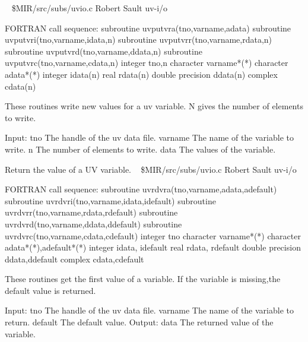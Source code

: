 \newline \ 
\newline {} \$MIR/src/subs/uvio.c
\newline {} Robert Sault
\newline {} uv-i/o
\par{\tenpoint
{\eightpoint\begintt
FORTRAN call sequence:
        subroutine uvputvra(tno,varname,adata)
        subroutine uvputvri(tno,varname,idata,n)
        subroutine uvputvrr(tno,varname,rdata,n)
        subroutine uvputvrd(tno,varname,ddata,n)
        subroutine uvputvrc(tno,varname,cdata,n)
        integer tno,n
        character varname*(*)
        character adata*(*)
        integer   idata(n)
        real      rdata(n)
        double precision ddata(n)
        complex cdata(n)

  These routines write new values for a uv variable. N gives the number
  of elements to write.

  Input:
    tno         The handle of the uv data file.
    varname     The name of the variable to write.
    n           The number of elements to write.
    data        The values of the variable.                             
\endtt}
\par}
%
\noindent Return the value of a UV variable.
\newline \ 
\newline {} \$MIR/src/subs/uvio.c
\newline {} Robert Sault
\newline \abox{Keywords:} uv-i/o
\par{\tenpoint
{\eightpoint\begintt
FORTRAN call sequence:
        subroutine uvrdvra(tno,varname,adata,adefault)
        subroutine uvrdvri(tno,varname,idata,idefault)
        subroutine uvrdvrr(tno,varname,rdata,rdefault)
        subroutine uvrdvrd(tno,varname,ddata,ddefault)
        subroutine uvrdvrc(tno,varname,cdata,cdefault)
        integer tno
        character varname*(*)
        character adata*(*),adefault*(*)
        integer   idata,    idefault
        real      rdata,    rdefault
        double precision ddata,ddefault
        complex cdata,cdefault

  These routines get the first value of a variable. If the variable is
  missing,the default value is returned.

  Input:
    tno         The handle of the uv data file.
    varname     The name of the variable to return.
    default     The default value.
  Output:
    data        The returned value of the variable.                     
\endtt}
\par}
